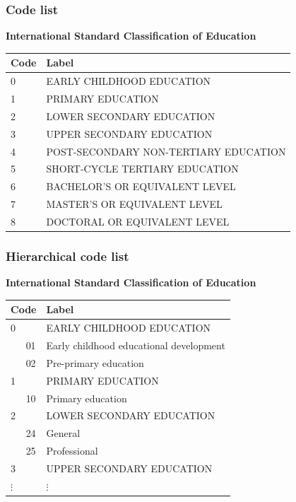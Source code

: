 \documentclass[aspectratio=1610]{beamer}
\begin{document}
\begin{frame}
  \frametitle{Code list}
  \begin{center}
  \textbf{International Standard Classification of Education}
  \begin{tabular}{ll}
    \toprule
    Code & Label \\
    \midrule
    0 &EARLY CHILDHOOD EDUCATION \\
    1 &PRIMARY EDUCATION \\
    2 &LOWER SECONDARY EDUCATION \\
    3 &UPPER SECONDARY EDUCATION \\
    4 &POST-SECONDARY NON-TERTIARY EDUCATION \\
    5 &SHORT-CYCLE TERTIARY EDUCATION \\
    6 &BACHELOR'S OR EQUIVALENT LEVEL \\
    7 &MASTER'S OR EQUIVALENT LEVEL \\
    8 &DOCTORAL OR EQUIVALENT LEVEL \\
    \bottomrule
  \end{tabular}
  \end{center}
\end{frame}

\begin{frame}
  \frametitle{Hierarchical code list}
  \begin{center}
  \textbf{International Standard Classification of Education}
  \begin{tabular}{lll}
    \toprule
    \multicolumn{2}{l}{Code} & Label \\
    \midrule
    0 &   &EARLY CHILDHOOD EDUCATION \\
      &01 &Early childhood educational development \\
      &02 &Pre-primary education \\
    1 &   &PRIMARY EDUCATION \\
      &10 &Primary education \\
    2 &   &LOWER SECONDARY EDUCATION \\
      &24 &General \\
      &25 &Professional \\
    3 &   &UPPER SECONDARY EDUCATION \\
    $\vdots$ &&$\vdots$\\
    \bottomrule
  \end{tabular}
  \end{center}
\end{frame}
\end{document}
